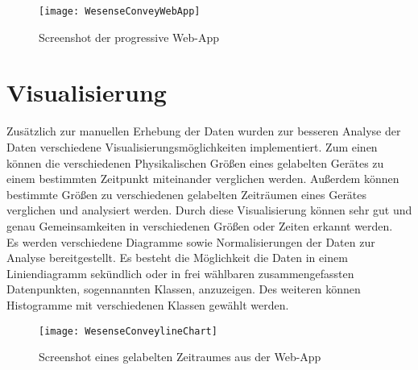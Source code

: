         \begin{figure}[h]
            \centering
            \texttt{[image: WesenseConveyWebApp]}
            \caption{Screenshot der progressive Web-App}
            \label{fig:WebApp1}
        \end{figure}

\section{Visualisierung}\label{VisualisierungWebApp}

        Zusätzlich zur manuellen Erhebung der Daten wurden zur besseren Analyse der Daten verschiedene Visualisierungsmöglichkeiten implementiert.
        Zum einen können die verschiedenen Physikalischen Größen eines gelabelten Gerätes zu einem bestimmten Zeitpunkt miteinander verglichen werden.
        Außerdem können bestimmte Größen zu verschiedenen gelabelten Zeiträumen eines Gerätes verglichen und analysiert werden.
        Durch diese Visualisierung können sehr gut und genau Gemeinsamkeiten in verschiedenen Größen oder Zeiten erkannt werden.\\
        \newline
        Es werden verschiedene Diagramme sowie Normalisierungen der Daten zur Analyse bereitgestellt.
        Es besteht die Möglichkeit die Daten in einem Liniendiagramm sekündlich oder in frei wählbaren zusammengefassten Datenpunkten, sogennannten Klassen, anzuzeigen.
        Des weiteren können Histogramme mit verschiedenen Klassen gewählt werden.

        \begin{figure}[h]
            \centering
            \texttt{[image: WesenseConveylineChart]}
            \caption{Screenshot eines gelabelten Zeitraumes aus der Web-App}
            \label{fig:WebApp2}
        \end{figure}

